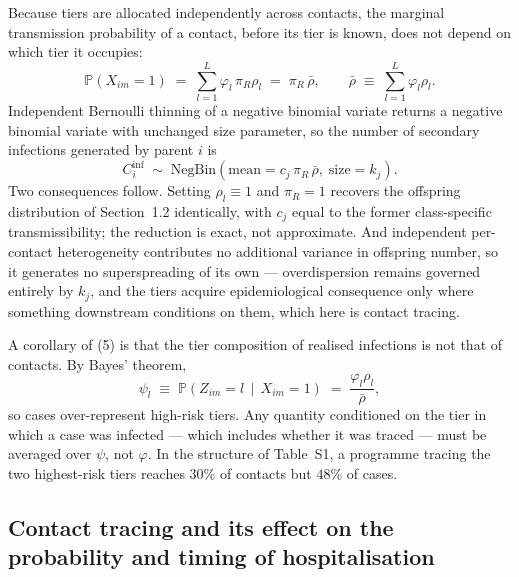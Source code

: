 \documentclass[9pt,letterpaper]{extarticle}
\newcommand{\NB}{\mathrm{NegBin}}
\newcommand{\Prob}{\mathbb{P}}
\begin{document}
Because tiers are allocated independently across contacts, the marginal transmission probability of a contact, before its tier is known, does not depend on which tier it occupies:
\begin{equation}
\Prob(X_{im} = 1) \;=\; \sum_{l=1}^{L} \varphi_l \,\pi_R \rho_l \;=\; \pi_R\,\bar{\rho},
\qquad
\bar{\rho} \;\equiv\; \sum_{l=1}^{L} \varphi_l \rho_l .
\end{equation}
Independent Bernoulli thinning of a negative binomial variate returns a negative binomial variate with unchanged size parameter, so the number of secondary infections generated by parent $i$ is
\begin{equation}
C_i^{\mathrm{inf}} \;\sim\; \NB\!\left(\text{mean} = c_j \,\pi_R\, \bar{\rho},\; \text{size} = k_j\right).
\end{equation}
Two consequences follow. Setting $\rho_l \equiv 1$ and $\pi_R = 1$ recovers the offspring distribution of Section~1.2 identically, with $c_j$ equal to the former class-specific transmissibility; the reduction is exact, not approximate. And independent per-contact heterogeneity contributes no additional variance in offspring number, so it generates no superspreading of its own --- overdispersion remains governed entirely by $k_j$, and the tiers acquire epidemiological consequence only where something downstream conditions on them, which here is contact tracing.

A corollary of (5) is that the tier composition of realised infections is not that of contacts. By Bayes' theorem,
\begin{equation}
\psi_l \;\equiv\; \Prob\!\left(Z_{im} = l \,\middle|\, X_{im} = 1\right) \;=\; \frac{\varphi_l \rho_l}{\bar{\rho}} ,
\end{equation}
so cases over-represent high-risk tiers. Any quantity conditioned on the tier in which a case was infected --- which includes whether it was traced --- must be averaged over $\psi$, not $\varphi$. In the structure of Table~S1, a programme tracing the two highest-risk tiers reaches $30\%$ of contacts but $48\%$ of cases.

\subsection{Contact tracing and its effect on the probability and timing of hospitalisation}
\end{document}
